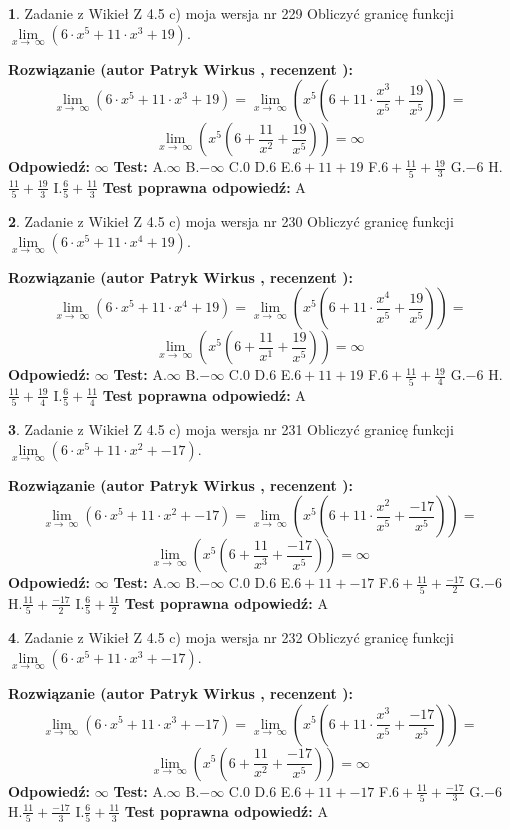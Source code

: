 \documentclass[12pt, a4paper]{article}
\theoremstyle{definition} %
\newtheorem{zad}{}
\newcommand{\zadStart}[1]{\begin{zad}#1\newline}
\newcommand{\zadStop}{\end{zad}}
\newcommand{\rozwStart}[2]{\noindent \textbf{Rozwiązanie (autor #1 , recenzent #2): }\newline}
\newcommand{\rozwStop}{\newline}
\newcommand{\odpStart}{\noindent \textbf{Odpowiedź:}\newline}
\newcommand{\odpStop}{\newline}
\newcommand{\testStart}{\noindent \textbf{Test:}\newline}
\newcommand{\testStop}{\newline}
\newcommand{\kluczStart}{\noindent \textbf{Test poprawna odpowiedź:}\newline}
\newcommand{\kluczStop}{\newline}
\begin{document}
\zadStart{Zadanie z Wikieł Z 4.5 c) moja wersja nr 229}
Obliczyć granicę funkcji  $\lim\limits_{x\to\ \infty}(6 \cdot x^{5}+11 \cdot x^{3}+19)$.
\zadStop
\rozwStart{Patryk Wirkus}{}
$$\lim\limits_{x\to\ \infty}(6 \cdot x^{5}+11 \cdot x^{3}+19) = \lim\limits_{x\to\ \infty}(x^{5}(6 +11 \cdot \frac{x^{3}}{x^{5}}+\frac{19}{x^{5}})) =$$ $$\lim\limits_{x\to\ \infty}(x^{5}(6 +\frac{11}{x^{2}}+\frac{19}{x^{5}})) =\infty$$
\rozwStop
\odpStart
$\infty$
\odpStop
\testStart
A.$\infty$ B.$-\infty$ C.$0$ D.$6$ E.$6 + 11 + 19$
F.$6+\frac{11}{5}+\frac{19}{3}$ G.$-6$
H.$\frac{11}{5}+\frac{19}{3}$
I.$\frac{6}{5}+\frac{11}{3}$
\testStop
\kluczStart
A
\kluczStop



\zadStart{Zadanie z Wikieł Z 4.5 c) moja wersja nr 230}
Obliczyć granicę funkcji  $\lim\limits_{x\to\ \infty}(6 \cdot x^{5}+11 \cdot x^{4}+19)$.
\zadStop
\rozwStart{Patryk Wirkus}{}
$$\lim\limits_{x\to\ \infty}(6 \cdot x^{5}+11 \cdot x^{4}+19) = \lim\limits_{x\to\ \infty}(x^{5}(6 +11 \cdot \frac{x^{4}}{x^{5}}+\frac{19}{x^{5}})) =$$ $$\lim\limits_{x\to\ \infty}(x^{5}(6 +\frac{11}{x^{1}}+\frac{19}{x^{5}})) =\infty$$
\rozwStop
\odpStart
$\infty$
\odpStop
\testStart
A.$\infty$ B.$-\infty$ C.$0$ D.$6$ E.$6 + 11 + 19$
F.$6+\frac{11}{5}+\frac{19}{4}$ G.$-6$
H.$\frac{11}{5}+\frac{19}{4}$
I.$\frac{6}{5}+\frac{11}{4}$
\testStop
\kluczStart
A
\kluczStop



\zadStart{Zadanie z Wikieł Z 4.5 c) moja wersja nr 231}
Obliczyć granicę funkcji  $\lim\limits_{x\to\ \infty}(6 \cdot x^{5}+11 \cdot x^{2}+-17)$.
\zadStop
\rozwStart{Patryk Wirkus}{}
$$\lim\limits_{x\to\ \infty}(6 \cdot x^{5}+11 \cdot x^{2}+-17) = \lim\limits_{x\to\ \infty}(x^{5}(6 +11 \cdot \frac{x^{2}}{x^{5}}+\frac{-17}{x^{5}})) =$$ $$\lim\limits_{x\to\ \infty}(x^{5}(6 +\frac{11}{x^{3}}+\frac{-17}{x^{5}})) =\infty$$
\rozwStop
\odpStart
$\infty$
\odpStop
\testStart
A.$\infty$ B.$-\infty$ C.$0$ D.$6$ E.$6 + 11 + -17$
F.$6+\frac{11}{5}+\frac{-17}{2}$ G.$-6$
H.$\frac{11}{5}+\frac{-17}{2}$
I.$\frac{6}{5}+\frac{11}{2}$
\testStop
\kluczStart
A
\kluczStop



\zadStart{Zadanie z Wikieł Z 4.5 c) moja wersja nr 232}
Obliczyć granicę funkcji  $\lim\limits_{x\to\ \infty}(6 \cdot x^{5}+11 \cdot x^{3}+-17)$.
\zadStop
\rozwStart{Patryk Wirkus}{}
$$\lim\limits_{x\to\ \infty}(6 \cdot x^{5}+11 \cdot x^{3}+-17) = \lim\limits_{x\to\ \infty}(x^{5}(6 +11 \cdot \frac{x^{3}}{x^{5}}+\frac{-17}{x^{5}})) =$$ $$\lim\limits_{x\to\ \infty}(x^{5}(6 +\frac{11}{x^{2}}+\frac{-17}{x^{5}})) =\infty$$
\rozwStop
\odpStart
$\infty$
\odpStop
\testStart
A.$\infty$ B.$-\infty$ C.$0$ D.$6$ E.$6 + 11 + -17$
F.$6+\frac{11}{5}+\frac{-17}{3}$ G.$-6$
H.$\frac{11}{5}+\frac{-17}{3}$
I.$\frac{6}{5}+\frac{11}{3}$
\testStop
\kluczStart
A
\kluczStop
\end{document}

